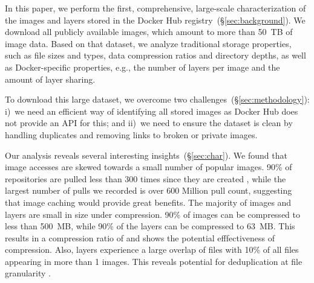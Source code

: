 In this paper, we perform the first, comprehensive, large-scale characterization
of the images and layers stored in the Docker Hub
registry~(\S\ref{sec:background}).
%
We download all publicly available images, which amount to more than 50~TB of
image data. Based on that dataset, we analyze traditional storage properties, such
as file sizes and types, data compression ratios and directory depths, as well as
Docker-specific properties, e.g., the number of layers per image and the amount of
layer sharing.

To download this large dataset, we overcome two
challenges~(\S\ref{sec:methodology}): i)~we need an efficient way of identifying
all stored images as Docker Hub does not provide an API for this;
 and ii)~we need to ensure the dataset is clean by handling
duplicates and removing links to broken or private images.

Our analysis reveals several interesting insights~(\S\ref{sec:char}). We found that image
accesses are skewed towards a small number of popular images. 90\% of repositories
are pulled less than 300 times since they are created , 
while the largest number of pulls we recorded is
over 600 Million pull count, suggesting that image caching would provide great benefits.
The
majority of images and layers are small in size under compression. 90\% of images
can be compressed to less than 500~MB, while 90\% of the layers can be compressed
to 63~MB. This results in a compression ratio of \gap and shows the potential efffectiveness of compression.
Also, layers experience a large overlap of files with 10\% of all files
appearing in more than 1 images. This reveals potential for deduplication at
file granularity .




